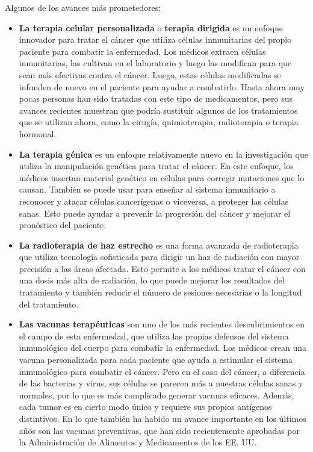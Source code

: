Algunos de los avances más prometedores:
\begin{itemize}
    \item \textbf{La terapia celular personalizada} o \textbf{terapia dirigida} es un enfoque innovador para tratar el cáncer que utiliza células inmunitarias del propio paciente para combatir la enfermedad. Los médicos extraen células inmunitarias, las cultivan en el laboratorio y luego las modifican para que sean más efectivas contra el cáncer. Luego, estas células modificadas se infunden de nuevo en el paciente para ayudar a combatirlo. Hasta ahora muy pocas personas han sido tratadas con este tipo de medicamentos, pero sus avances recientes muestran que podría sustituir algunos de los tratamientos que se utilizan ahora, como la cirugía, quimioterapia, radioterapia o terapia hormonal.
    \item \textbf{La terapia génica} es un enfoque relativamente nuevo en la investigación que utiliza la manipulación genética para tratar el cáncer. En este enfoque, los médicos insertan material genético en células para corregir mutaciones que lo causan. También se puede usar para enseñar al sistema inmunitario a reconocer y atacar células cancerígenas o viceversa, a proteger las células sanas. Esto puede ayudar a prevenir la progresión del cáncer y mejorar el pronóstico del paciente.
    \item \textbf{La radioterapia de haz estrecho} es una forma avanzada de radioterapia que utiliza tecnología sofisticada para dirigir un haz de radiación con mayor precisión a las áreas afectada. Esto permite a los médicos tratar el cáncer con una dosis más alta de radiación, lo que puede mejorar los resultados del tratamiento y también reducir el número de sesiones necesarias o la longitud del tratamiento.
    \item \textbf{Las vacunas terapéuticas} son uno de los más recientes descubrimientos en el campo de esta enfermedad, que utiliza las propias defensas del sistema inmunológico del cuerpo para combatir la enfermedad. Los médicos crean una vacuna personalizada para cada paciente que ayuda a estimular el sistema inmunológico para combatir el cáncer. Pero en el caso del cáncer, a diferencia de las bacterias y virus, sus células se parecen más a nuestras células sanas y normales, por lo que es más complicado generar vacunas eficaces. Además, cada tumor es en cierto modo único y requiere sus propios antígenos distintivos. En lo que también ha habido un avance importante en los últimos años son las vacunas preventivas, que han sido recientemente aprobadas por la Administración de Alimentos y Medicamentos de los EE. UU.
\end{itemize}

